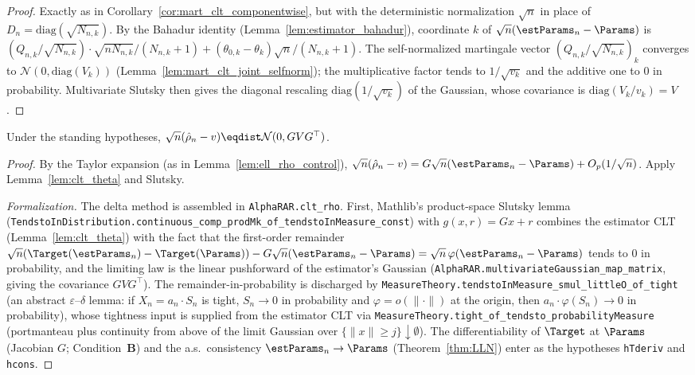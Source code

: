 \begin{proof}\leanok
{}
Exactly as in Corollary~\ref{cor:mart_clt_componentwise}, but with the deterministic
normalization $\sqrt n$ in place of $D_n=\mathrm{diag}(\sqrt{N_{n,k}})$. By the Bahadur
identity (Lemma~\ref{lem:estimator_bahadur}), coordinate $k$ of
$\sqrt n(\estParams_n-\Params)$ is
$(Q_{n,k}/\sqrt{N_{n,k}})\cdot\sqrt{nN_{n,k}}/(N_{n,k}+1)
 + (\theta_{0,k}-\theta_k)\sqrt n/(N_{n,k}+1)$. The self-normalized martingale vector
$(Q_{n,k}/\sqrt{N_{n,k}})_k$ converges to $\mathcal N(0,\mathrm{diag}(V_k))$
(Lemma~\ref{lem:mart_clt_joint_selfnorm}); the multiplicative factor tends to $1/\sqrt{v_k}$ and
the additive one to $0$ in probability. Multivariate Slutsky then gives the diagonal rescaling
$\mathrm{diag}(1/\sqrt{v_k})$ of the Gaussian, whose covariance is $\mathrm{diag}(V_k/v_k)=V$.
\end{proof}

\begin{lemma}\label{lem:clt_rho}
\leanok
{}
Under the standing hypotheses, $\sqrt n(\hat{\rho}_n - v)\eqdist\mathcal{N}(0,GVG^\top)$.
\end{lemma}

\begin{proof}\leanok
{}
By the Taylor expansion (as in Lemma~\ref{lem:ell_rho_control}),
$\sqrt n(\hat{\rho}_n-v)=G\sqrt n(\estParams_n-\Params)+O_p(1/\sqrt n)$. Apply
Lemma~\ref{lem:clt_theta} and Slutsky.

\emph{Formalization.} The delta method is assembled in
\texttt{AlphaRAR.clt\_rho}. First, Mathlib's product-space Slutsky lemma
(\texttt{TendstoInDistribution.continuous\_comp\_prodMk\_of\_tendstoInMeasure\_const}) with
$g(x,r)=Gx+r$ combines the estimator
CLT (Lemma~\ref{lem:clt_theta}) with the fact that the first-order remainder
$\sqrt n(\Target(\estParams_n)-\Target(\Params))-G\sqrt n(\estParams_n-\Params)=\sqrt n\,\varphi(\estParams_n-\Params)$
tends to $0$ in probability, and the limiting law is the linear pushforward of the estimator's Gaussian
(\texttt{AlphaRAR.multivariateGaussian\_map\_matrix}, giving the covariance $GVG^\top$). The
remainder-in-probability is discharged by \texttt{MeasureTheory.tendstoInMeasure\_smul\_littleO\_of\_tight}
(an abstract $\varepsilon$--$\delta$ lemma: if $X_n=a_n\cdot S_n$ is tight, $S_n\to0$ in probability and
$\varphi=o(\|\cdot\|)$ at the origin, then $a_n\cdot\varphi(S_n)\to0$ in probability), whose tightness
input is supplied from the estimator CLT via
\texttt{MeasureTheory.tight\_of\_tendsto\_probabilityMeasure} (portmanteau plus continuity from above of
the limit Gaussian over $\{\|x\|\ge j\}\downarrow\emptyset$). The differentiability of $\Target$ at
$\Params$ (Jacobian $G$; Condition~\textbf{B}) and the a.s.\ consistency $\estParams_n\to\Params$
(Theorem~\ref{thm:LLN}) enter as the hypotheses \texttt{hTderiv} and \texttt{hcons}.
\end{proof}


